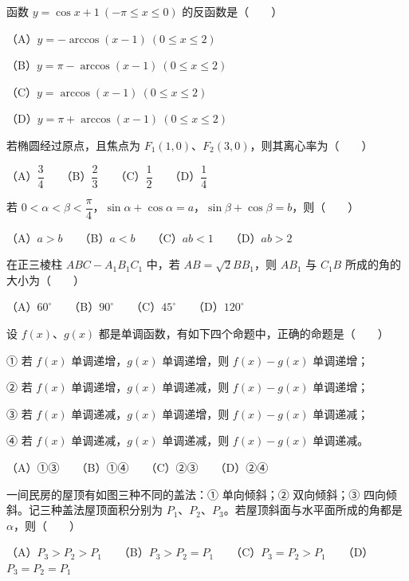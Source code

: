 \begin{question}
函数 $y=\cos x+1\ (-\pi\le x\le0)$ 的反函数是\mbox{（　　）}

（A）$y=-\arccos(x-1)\ (0\le x\le2)$

（B）$y=\pi-\arccos(x-1)\ (0\le x\le2)$

（C）$y=\arccos(x-1)\ (0\le x\le2)$

（D）$y=\pi+\arccos(x-1)\ (0\le x\le2)$

\end{question}
\begin{question}
若椭圆经过原点，且焦点为 $F_1(1,0)$、$F_2(3,0)$，则其离心率为\mbox{（　　）}

（A）$\dfrac34$　　（B）$\dfrac23$　　（C）$\dfrac12$　　（D）$\dfrac14$

\end{question}
\begin{question}
若 $0<\alpha<\beta<\dfrac\pi4$，$\sin\alpha+\cos\alpha=a$，$\sin\beta+\cos\beta=b$，则\mbox{（　　）}

（A）$a>b$　　（B）$a<b$　　（C）$ab<1$　　（D）$ab>2$

\end{question}
\begin{question}
在正三棱柱 $ABC-A_1B_1C_1$ 中，若 $AB=\sqrt2BB_1$，则 $AB_1$ 与 $C_1B$ 所成的角的大小为\mbox{（　　）}

（A）$60^\circ$　　（B）$90^\circ$　　（C）$45^\circ$　　（D）$120^\circ$

\end{question}
\begin{question}
设 $f(x)$、$g(x)$ 都是单调函数，有如下四个命题中，正确的命题是\mbox{（　　）}

① 若 $f(x)$ 单调递增，$g(x)$ 单调递增，则 $f(x)-g(x)$ 单调递增；

② 若 $f(x)$ 单调递增，$g(x)$ 单调递减，则 $f(x)-g(x)$ 单调递增；

③ 若 $f(x)$ 单调递减，$g(x)$ 单调递增，则 $f(x)-g(x)$ 单调递减；

④ 若 $f(x)$ 单调递减，$g(x)$ 单调递减，则 $f(x)-g(x)$ 单调递减。

（A）①③　　（B）①④　　（C）②③　　（D）②④

\Needspace{0.4\textheight}
\end{question}
\begin{question}
一间民房的屋顶有如图三种不同的盖法：① 单向倾斜；② 双向倾斜；③ 四向倾斜。记三种盖法屋顶面积分别为 $P_1$、$P_2$、$P_3$。若屋顶斜面与水平面所成的角都是 $\alpha$，则\mbox{（　　）}
\nopagebreak[4]
\begin{center}\end{center}
\nopagebreak[4]
（A）$P_3>P_2>P_1$　　（B）$P_3>P_2=P_1$　　（C）$P_3=P_2>P_1$　　（D）$P_3=P_2=P_1$

\Needspace{0.4\textheight}
\end{question}
